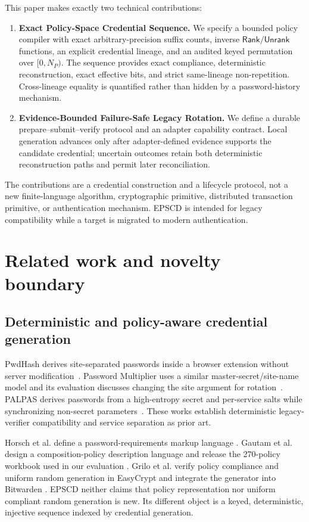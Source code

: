 \documentclass[preprint,12pt]{elsarticle}
\newcommand{\Rank}{\mathsf{Rank}}
\newcommand{\Unrank}{\mathsf{Unrank}}
\begin{document}
This paper makes exactly two technical contributions:

\begin{enumerate}
\item \textbf{Exact Policy-Space Credential Sequence.} We specify a bounded
  policy compiler with exact arbitrary-precision suffix counts, inverse
  $\Rank/\Unrank$ functions, an explicit credential lineage, and an audited
  keyed permutation over $[0,N_P)$. The sequence provides exact compliance,
  deterministic reconstruction, exact effective bits, and strict same-lineage
  non-repetition. Cross-lineage equality is quantified rather than hidden by a
  password-history mechanism.
\item \textbf{Evidence-Bounded Failure-Safe Legacy Rotation.} We define a
  durable prepare--submit--verify protocol and an adapter capability contract.
  Local generation advances only after adapter-defined evidence supports the
  candidate credential; uncertain outcomes retain both deterministic
  reconstruction paths and permit later reconciliation.
\end{enumerate}

The contributions are a credential construction and a lifecycle protocol, not
a new finite-language algorithm, cryptographic primitive, distributed
transaction primitive, or authentication mechanism. EPSCD is intended for
legacy compatibility while a target is migrated to modern authentication.

\section{Related work and novelty boundary}

\subsection{Deterministic and policy-aware credential generation}

PwdHash derives site-separated passwords inside a browser extension without
server modification~\cite{ross2005pwdhash}. Password Multiplier uses a similar
master-secret/site-name model and its evaluation discusses changing the site
argument for rotation~\cite{halderman2005multiplier}. PALPAS derives passwords
from a high-entropy secret and per-service salts while synchronizing non-secret
parameters~\cite{palpas}. These works establish deterministic legacy-verifier
compatibility and service separation as prior art.

Horsch et al. define a password-requirements markup language
\cite{horsch2016prml}. Gautam et al. design a composition-policy description
language and release the 270-policy workbook used in our evaluation
\cite{gautam2022pcp}. Grilo et al. verify policy compliance and uniform random
generation in EasyCrypt and integrate the generator into Bitwarden
\cite{grilo2022verified}. EPSCD neither claims that policy representation nor
uniform compliant random generation is new. Its different object is a keyed,
deterministic, injective sequence indexed by credential generation.
\end{document}
